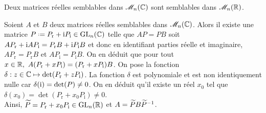 \begin{prop}
    Deux matrices réelles semblables dans $\mathscr{M}_n(\mathbb{C})$ sont semblables dans $\mathscr{M}_n(\mathbb{R})$.
\end{prop}

\begin{preuve}
    Soient $A$ et $B$ deux matrices réelles semblables dans $\mathscr{M}_n(\mathbb{C})$. Alors il existe une matrice $P \defeq P_{\mathrm{r}} + \mi P_{\mathrm{i}} \in \Gl_n(\C)$ telle que $AP = PB$ soit $A P_{\mathrm{r}} + \mathrm{i} A P_{\mathrm{i}} = P_{\mathrm{r}} B + \mathrm{i} P_{\mathrm{i}} B$ et donc en identifiant parties réelle et imaginaire, $A P_{\mathrm{r}} = P_{\mathrm{r}} B$ et $A P_{\mathrm{i}} = P_{\mathrm{i}} B$. On en déduit que pour tout $x \in \R,\ A(P_{\mathrm{r}} + x P_{\mathrm{i}}) = (P_{\mathrm{r}} + x P_{\mathrm{i}})B$. On pose la fonction $\delta : z \in \mathbb{C} \mapsto \det(P_{\mathrm{r}} + z P_{\mathrm{i}})$. La fonction $\delta$ est polynomiale et est non identiquement nulle car $\delta(\mathrm{i}) = \det(P) \not=0$. On en déduit qu'il existe un réel $x_0$ tel que $\delta(x_0) = \det(P_{\mathrm{r}} + x_0 P_{\mathrm{i}}) \not=0$. \\
    Ainsi, $\widetilde{P} = P_{\mathrm{r}} + x_0 P_{\mathrm{i}} \in \mathrm{GL}_n(\mathbb{R})$ et $A = \widetilde{P}B\widetilde{P}^{-1}$.
\end{preuve}